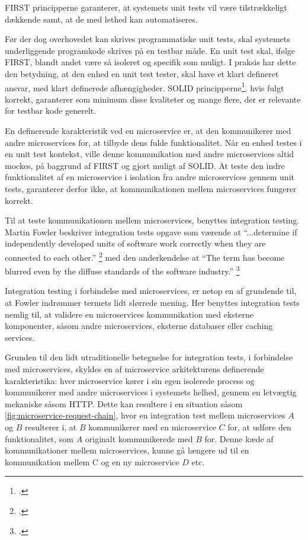 \documentclass{article}
\begin{document}
FIRST principperne garanterer, at systemets unit tests vil være tilstrækkeligt dækkende samt, at de med lethed kan automatiseres.

Før der dog overhovedet kan skrives programmatiske unit tests, skal systemets underliggende programkode skrives på en testbar måde. En unit test skal, ifølge FIRST, blandt andet være så isoleret og specifik som muligt. I praksis har dette den betydning, at den enhed en unit test tester, skal have et klart defineret ansvar, med klart definerede afhængigheder. SOLID principperne\footcite{martin:solid}, hvis fulgt korrekt, garanterer som minimum disse kvaliteter og mange flere, der er relevante for testbar kode generelt.

En definerende karakteristik ved en microservice er, at den kommunikerer med andre microservices for, at tilbyde dens fulde funktionalitet. Når en enhed testes i en unit test kontekst, ville denne kommunikation med andre microservices altid mockes, på baggrund af FIRST og gjort muligt af SOLID. At teste den indre funktionalitet af en microservice i isolation fra andre microservices gennem unit tests, garanterer derfor ikke, at kommunikationen mellem microservices fungerer korrekt.

Til at teste kommunikationen mellem microservices, benyttes integration testing. Martin Fowler beskriver integration tests opgave som værende at ``...determine if independently developed units of software work correctly when they are connected to each other.'' \footcite{fowler:integration-test} med den anderkendelse at ``The term has become blurred even by the diffuse standards of the software industry.'' \footcite{fowler:integration-test} 

Integration testing i forbindelse med microservices, er netop en af grundende til, at Fowler indrømmer termets lidt slørrede mening. Her benyttes integration tests nemlig til, at validere en microservices kommunikation med eksterne komponenter, såsom andre microservices, eksterne databaser eller caching services.

Grunden til den lidt utraditionelle betegnelse for integration tests, i forbindelse med microservices, skyldes en af microservice arkitekturens definerende karakteristika: hver microservice kører i sin egen isolerede process og kommunikerer med andre microservices i systemets helhed, gennem en letvægtig mekaniske såsom HTTP. Dette kan resultere i en situation såsom \cref{fig:microservice-request-chain}, hvor en integration test mellem microservices $A$ og $B$ resulterer i, at $B$ kommunikerer med en microservice $C$ for, at udføre den funktionalitet, som $A$ originalt kommunikerede med $B$ for. Denne kæde af kommunikationer mellem microservices, kunne gå længere ud til en kommunikation mellem C og en ny microservice $D$ etc.
\end{document}
